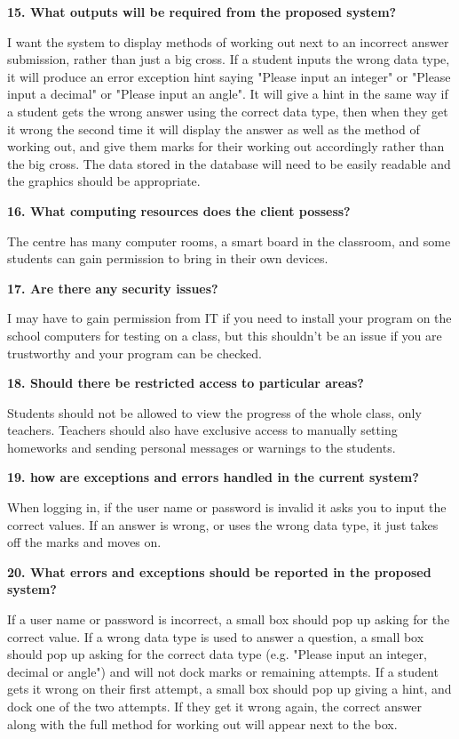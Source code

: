 \textbf{15. What outputs will be required from the proposed system?}

I want the system to display methods of working out next to an incorrect answer submission, rather than just a big cross. If a student inputs the wrong data type, it will produce an error exception hint saying "Please input an integer" or "Please input a decimal" or "Please input an angle". It will give a hint in the same way if a student gets the wrong answer using the correct data type, then when they get it wrong the second time it will display the answer as well as the method of working out, and give them marks for their working out accordingly rather than the big cross. The data stored in the database will need to be easily readable and the graphics should be appropriate.

\textbf{16. What computing resources does the client possess?}

The centre has many computer rooms, a smart board in the classroom, and some students can gain permission to bring in their own devices.

\textbf{17. Are there any security issues?}

I may have to gain permission from IT if you need to install your program on the school computers for testing on a class, but this shouldn't be an issue if you are trustworthy and your program can be checked.

\textbf{18. Should there be restricted access to particular areas?}

Students should not be allowed to view the progress of the whole class, only teachers. Teachers should also have exclusive access to manually setting homeworks and sending personal messages or warnings to the students. 

\textbf{19. how are exceptions and errors handled in the current system?}

When logging in, if the user name or password is invalid it asks you to input the correct values. If an answer is wrong, or uses the wrong data type, it just takes off the marks and moves on.

\textbf{20. What errors and exceptions should be reported in the proposed system?}

If a user name or password is incorrect, a small box should pop up asking for the correct value. If a wrong data type is used to answer a question, a small box should pop up asking for the correct data type (e.g. "Please input an integer, decimal or angle") and will not dock marks or remaining attempts. If a student gets it wrong on their first attempt, a small box should pop up giving a hint, and dock one of the two attempts. If they get it wrong again, the correct answer along with the full method for working out will appear next to the box.

